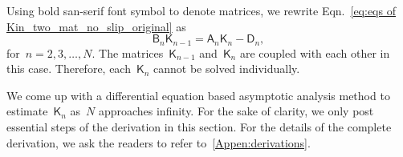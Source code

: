 \documentclass[preprint,10pt,times]{elsarticle}
\numberwithin{equation}{section}
\renewcommand{\u}[1]{\boldsymbol{#1}}
\newcommand{\usf}[1]{\u{\mathsf #1}}
\renewcommand{\>}{$\Rightarrow$}
\begin{document}
Using bold san-serif font symbol to denote matrices, we rewrite Eqn.~\eqref{eq:eqs of Kin_two_mat_no_slip_original} as
\begin{equation}
	\usf{B}_n \usf{K}_{n-1} = \usf{A}_n \usf{K}_n - \usf{D}_n,
	\label{eq:eqs of Kin_two_mat_no_slip_np1}
\end{equation}
for~$n = 2,3,\dots,N$. The matrices~$\usf{K}_{n-1}$ and~$\usf{K}_n$ are coupled with each other in this case. Therefore, each~$\usf{K}_n$ cannot be solved individually.

We come up with a differential equation based asymptotic analysis method to estimate~$\usf{K}_n$ as~$N$ approaches infinity. For the sake of clarity, we only post essential steps of the derivation in this section. For the details of the complete derivation, we ask the readers to refer to~\ref{Appen:derivations}.
\end{document}
